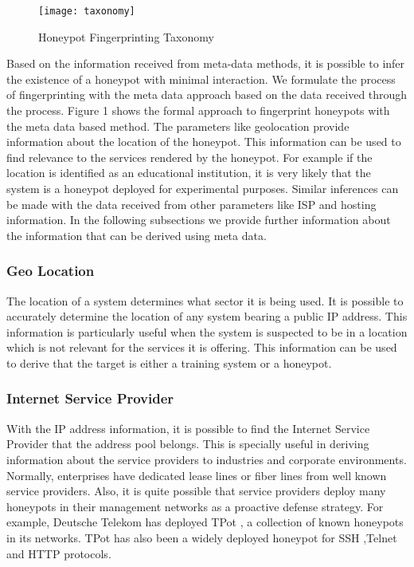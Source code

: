 \documentclass[../main.tex]{subfiles}
\begin{document}
\begin{figure}
    \centering
    \texttt{[image: taxonomy]}
    \caption{Honeypot Fingerprinting Taxonomy}
    \label{fig:taxonomy}
\end{figure}


Based on the information received from meta-data methods, it is possible to infer the existence of a honeypot with minimal interaction. We formulate the process of fingerprinting with the meta data approach based on the data received through the process. Figure 1 shows the formal approach to fingerprint honeypots with the meta data based method. The parameters like geolocation provide information about the location of the honeypot. This information can be used to find relevance to the services rendered by the honeypot. For example if the location is identified as an educational institution, it is very likely that the system is a honeypot deployed for experimental purposes. Similar inferences can be made with the data received from other parameters like ISP and hosting information. In the following subsections we provide further information about the information that can be derived using meta data. 
\newline
\subsubsection{Geo Location}
The location of a system determines what sector it is being used. It is possible to accurately determine the location of any system bearing a public IP address. This information is particularly useful when the system is suspected to be in a location which is not relevant for the services it is offering. This information can be used to derive that the target is either a training system or a honeypot. 
\newline
\subsubsection{Internet Service Provider}
With the IP address information, it is possible to find the Internet Service Provider that the address pool belongs. This is specially useful in deriving information about the service providers to industries and corporate environments. Normally, enterprises have dedicated lease lines or fiber lines from well known service providers. Also, it is quite possible that service providers deploy many honeypots in their management networks as a proactive defense strategy. For example, Deutsche Telekom has deployed TPot \cite{TPot}, a collection of known honeypots in its networks. TPot has also been a widely deployed honeypot for SSH ,Telnet and HTTP protocols. 
\newline
\end{document}
